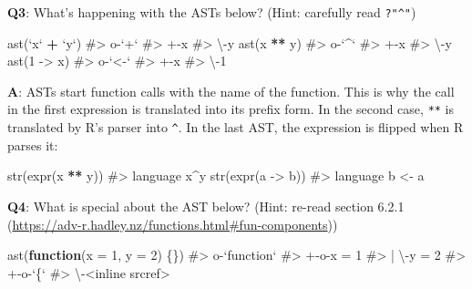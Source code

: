 \documentclass[
]{krantz}
\makeatletter
\newenvironment{Shaded}{\begin{snugshade}}{\end{snugshade}}
\newcommand{\CommentTok}[1]{\textcolor[rgb]{0.56,0.35,0.01}{\textit{#1}}}
\newcommand{\ControlFlowTok}[1]{\textcolor[rgb]{0.13,0.29,0.53}{\textbf{#1}}}
\newcommand{\DataTypeTok}[1]{\textcolor[rgb]{0.13,0.29,0.53}{#1}}
\newcommand{\DecValTok}[1]{\textcolor[rgb]{0.00,0.00,0.81}{#1}}
\newcommand{\KeywordTok}[1]{\textcolor[rgb]{0.13,0.29,0.53}{\textbf{#1}}}
\newcommand{\NormalTok}[1]{#1}
\newcommand{\OperatorTok}[1]{\textcolor[rgb]{0.81,0.36,0.00}{\textbf{#1}}}
\newcommand{\StringTok}[1]{\textcolor[rgb]{0.31,0.60,0.02}{#1}}
\renewcommand{\href}[2]{#2 (\url{#1})}
\newenvironment{kframe}{%
\medskip{}
\setlength{\fboxsep}{.8em}
 \def\at@end@of@kframe{}%
 \ifinner\ifhmode%
  \def\at@end@of@kframe{\end{minipage}}%
  \begin{minipage}{\columnwidth}%
 \fi\fi%
 \def\FrameCommand##1{\hskip\@totalleftmargin \hskip-\fboxsep
 \colorbox{shadecolor}{##1}\hskip-\fboxsep
     \hskip-\linewidth \hskip-\@totalleftmargin \hskip\columnwidth}%
 \MakeFramed {\advance\hsize-\width
   \@totalleftmargin\z@ \linewidth\hsize
   \@setminipage}}%
 {\par\unskip\endMakeFramed%
 \at@end@of@kframe}
\renewenvironment{Shaded}{\begin{kframe}}{\end{kframe}}
\renewcommand{\KeywordTok} [1]{\textcolor[rgb]{0.00,0.44,0.13}{{#1}}}
\renewcommand{\DataTypeTok}[1]{\textcolor[rgb]{0.56,0.13,0.00}{{#1}}}
\renewcommand{\DecValTok}  [1]{\textcolor[rgb]{0.25,0.63,0.44}{{#1}}}
\renewcommand{\StringTok}  [1]{\textcolor[rgb]{0.25,0.44,0.63}{{#1}}}
\renewcommand{\CommentTok} [1]{\textcolor[rgb]{0.38,0.63,0.69}{{#1}}}
\renewcommand{\NormalTok}  [1]{{#1}}
\makeatother
\begin{document}
\textbf{{Q3}}: What's happening with the ASTs below? (Hint: carefully read \texttt{?"\^{}"})

\begin{Shaded}
\begin{Highlighting}[]
\KeywordTok{ast}\NormalTok{(}\StringTok{`}\DataTypeTok{x}\StringTok{`} \OperatorTok{+}\StringTok{ `}\DataTypeTok{y}\StringTok{`}\NormalTok{)}
\CommentTok{#> o-`+` }
\CommentTok{#> +-x }
\CommentTok{#> \textbackslash{}-y}
\KeywordTok{ast}\NormalTok{(x }\OperatorTok{**}\StringTok{ }\NormalTok{y)}
\CommentTok{#> o-`^` }
\CommentTok{#> +-x }
\CommentTok{#> \textbackslash{}-y}
\KeywordTok{ast}\NormalTok{(}\DecValTok{1}\NormalTok{ ->}\StringTok{ }\NormalTok{x)}
\CommentTok{#> o-`<-` }
\CommentTok{#> +-x }
\CommentTok{#> \textbackslash{}-1}
\end{Highlighting}
\end{Shaded}

\textbf{{A}}: ASTs start function calls with the name of the function. This is why the call in the first expression is translated into its prefix form. In the second case, \texttt{**} is translated by R's parser into \texttt{\^{}}. In the last AST, the expression is flipped when R parses it:

\begin{Shaded}
\begin{Highlighting}[]
\KeywordTok{str}\NormalTok{(}\KeywordTok{expr}\NormalTok{(x }\OperatorTok{**}\StringTok{ }\NormalTok{y))}
\CommentTok{#>  language x^y}
\KeywordTok{str}\NormalTok{(}\KeywordTok{expr}\NormalTok{(a ->}\StringTok{ }\NormalTok{b))}
\CommentTok{#>  language b <- a}
\end{Highlighting}
\end{Shaded}

\textbf{{Q4}}: What is special about the AST below? (Hint: re-read section \href{https://adv-r.hadley.nz/functions.html\#fun-components}{6.2.1})

\begin{Shaded}
\begin{Highlighting}[]
\KeywordTok{ast}\NormalTok{(}\ControlFlowTok{function}\NormalTok{(}\DataTypeTok{x =} \DecValTok{1}\NormalTok{, }\DataTypeTok{y =} \DecValTok{2}\NormalTok{) \{\})}
\CommentTok{#> o-`function` }
\CommentTok{#> +-o-x = 1 }
\CommentTok{#> | \textbackslash{}-y = 2 }
\CommentTok{#> +-o-`\{` }
\CommentTok{#> \textbackslash{}-<inline srcref>}
\end{Highlighting}
\end{Shaded}
\end{document}
